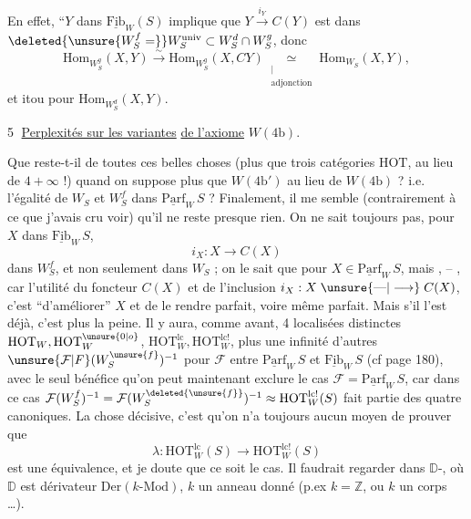 En effet, ``$Y$ dans $\underline{\mathrm{Fib}}_W(S)$ implique que $Y\xrightarrow{i_Y}C(Y)$ est
dans $\deleted{\unsure{W_S^f=}}W_S^{\mathrm{univ}}\subset W_S^d\cap W_S^g$, donc
\[
\mathrm{Hom}_{W_S^g}(X,Y)\xrightarrow{\sim}\mathrm{Hom}_{W_S^g}(X,CY)
\mathrel{\underset{\substack{\vert\\\text{adjonction}}}{\simeq}}\mathrm{Hom}_{W_S}(X,Y),
\]
et itou pour $\mathrm{Hom}_{W_S^d}(X,Y)$.

\textcircled{5}  \uline{Perplexités sur les variantes}  \uline{de l'axiome} $W(4\mathrm b)$.

Que reste-t-il de toutes ces belles choses (plus
que trois catégories $\mathrm{HOT}$, au lieu de $4+\infty$ !) quand
on  suppose plus que $W(4\mathrm b')$ au lieu de $W(4\mathrm b)$ ?
i.e. l'égalité de $W_S$ et $W_S^f$ dans $\underline{\mathrm{Parf}}_W\,S$ ?
Finalement, il me semble (contrairement à ce que
j'avais cru voir) qu'il ne reste presque rien.
On ne sait  toujours pas, pour $X$ dans $\underline{\mathrm{Fib}}_W\,S$,
\[
i_X:X\longrightarrow C(X)
\]
dans $W_S^f$, et non seulement dans $W_S$ ; on
le sait que pour $X\in\underline{\mathrm{Parf}}_W\,S$, mais
,  -- , car l'utilité
du foncteur $C(X)$ et de l'inclusion $i_X:X\mathrel{\unsure{\text{---}|\longrightarrow}}C(X)$,
c'est ``d'améliorer'' $X$ et de le rendre
parfait, voire même  parfait. Mais s'il l'est
déjà, c'est plus la peine. Il y aura, comme
avant, 4 localisées  distinctes $\mathrm{HOT}_W,\mathrm{HOT}_W^{\unsure{0|o}}$,
$\mathrm{HOT}_W^{\mathrm{lc}},\mathrm{HOT}_W^{\mathrm{lc}!}$, plus une infinité d'autres 
$\unsure{\mathcal{F}|F}(W_S^{\unsure{f}})^{-1}$ pour $\mathcal{F}$ entre $\underline{\mathrm{Parf}}_W\,S$ et $\underline{\mathrm{Fib}}_W\,S$ (cf page 180),
avec le seul bénéfice qu'on peut maintenant exclure
le cas $\mathcal{F}=\underline{\mathrm{Parf}}_W\,S$, car dans ce cas $\mathcal{F}(W_S^f)^{-1}=\mathcal{F}(W_S^{\deleted{\unsure{f}}})^{-1}
\approx\mathrm{HOT}_W^{\mathrm{lc}!}(S)$ fait partie des quatre canoniques. La
chose décisive, c'est qu'on n'a toujours aucun moyen
de prouver que
\[
\lambda:\mathrm{HOT}_W^{\mathrm{lc}}(S)\longrightarrow\mathrm{HOT}_W^{\mathrm{lc}!}(S)
\]
est une équivalence, et je doute que  ce soit
le cas. Il faudrait regarder dans   $\mathbb{D}$-,
où $\mathbb{D}$ est  dérivateur $\mathrm{Der}(k\text{-}\mathrm{Mod})$, $k$ un
anneau donné (p.ex $k=\mathbb{Z}$, ou $k$ un corps \ldots).

